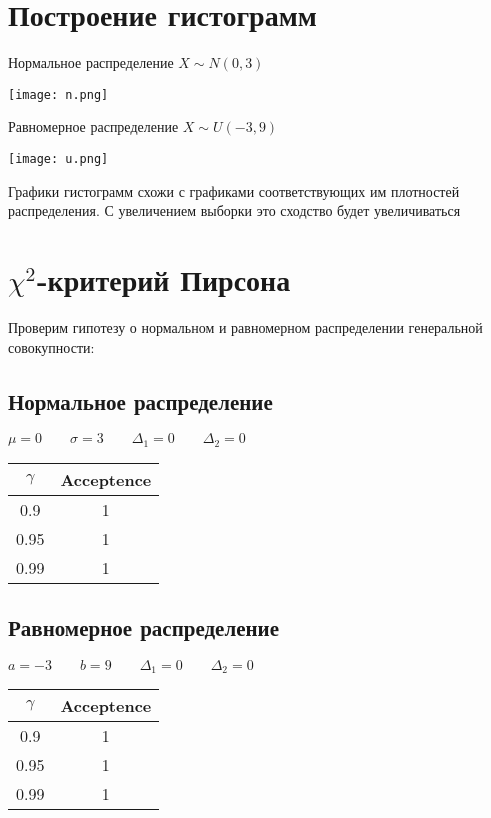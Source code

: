 \documentclass[12pt, a4paper]{article}
\begin{document}
\section{Построение гистограмм}

Нормальное распределение $X \sim N(0, 3)$

\texttt{[image: n.png]}

Равномерное распределение $X \sim U(-3, 9)$

\texttt{[image: u.png]}

Графики гистограмм схожи с графиками соответствующих им плотностей распределения. С увеличением выборки это сходство будет увеличиваться

\newpage

\section{$\chi^2$-критерий Пирсона}


Проверим гипотезу о нормальном и равномерном распределении генеральной совокупности:

\subsection{Нормальное распределение}

$\mu = 0 \qquad \sigma = 3 \qquad \Delta_1 = 0 \qquad \Delta_2 = 0$

\begin{center}
    \begin{tabular}{|c|c|}
         \hline $\gamma$ & Acceptence \\
         \hline 0.9 & 1 \\
         \hline 0.95 & 1 \\
         \hline 0.99 & 1 \\
         \hline
    \end{tabular}
\end{center}

\subsection{Равномерное распределение}

$a = -3 \qquad b = 9 \qquad \Delta_1 = 0 \qquad \Delta_2 = 0$
\begin{center}
    \begin{tabular}{|c|c|}
         \hline $\gamma$ & Acceptence \\
         \hline 0.9 & 1 \\
         \hline 0.95 & 1 \\
         \hline 0.99 & 1 \\
         \hline
    \end{tabular}
\end{center}
\end{document}
